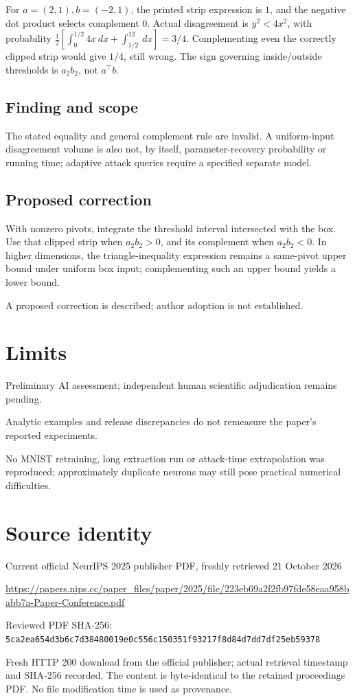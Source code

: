 \documentclass[11pt]{article}
\begin{document}
For \(a=(2,1),b=(-2,1)\), the printed strip expression is \(1\), and the negative dot product selects complement \(0\). Actual disagreement is \(y^2<4x^2\), with probability \(\frac12[\int_0^{1/2}4x\,dx+\int_{1/2}^12\,dx]=3/4\). Complementing even the correctly clipped strip would give \(1/4\), still wrong. The sign governing inside/outside thresholds is \(a_2b_2\), not \(a^{\top}b\).

\subsection*{Finding and scope}

The stated equality and general complement rule are invalid. A uniform-input disagreement volume is also not, by itself, parameter-recovery probability or running time; adaptive attack queries require a specified separate model.

\subsection*{Proposed correction}

With nonzero pivots, integrate the threshold interval intersected with the box. Use that clipped strip when \(a_2b_2>0\), and its complement when \(a_2b_2<0\). In higher dimensions, the triangle-inequality expression remains a same-pivot upper bound under uniform box input; complementing such an upper bound yields a lower bound.

A proposed correction is described; author adoption is not established.

\section*{Limits}

Preliminary AI assessment; independent human scientific adjudication remains pending.\par

Analytic examples and release discrepancies do not remeasure the paper’s reported experiments.\par

No MNIST retraining, long extraction run or attack-time extrapolation was reproduced; approximately duplicate neurons may still pose practical numerical difficulties.\par

\section*{Source identity}

Current official NeurIPS 2025 publisher PDF, freshly retrieved 21 October 2026

\url{https://papers.nips.cc/paper_files/paper/2025/file/223eb69a2f2fb97fde58eaa958babb7a-Paper-Conference.pdf}

Reviewed PDF SHA-256: \nolinkurl{5ca2ea654d3b6c7d38480019e0c556c150351f93217f8d84d7dd7df25eb59378}

Fresh HTTP 200 download from the official publisher; actual retrieval timestamp and SHA-256 recorded. The content is byte-identical to the retained proceedings PDF. No file modification time is used as provenance.
\end{document}
